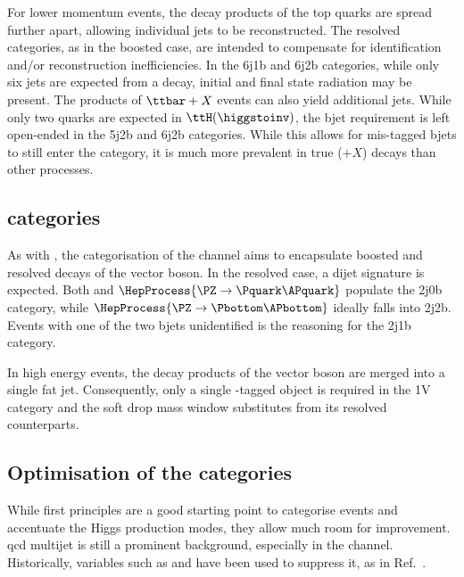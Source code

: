For lower momentum events, the decay products of the top quarks are spread further apart, allowing individual \glspl{jet} to be reconstructed. The \ttH resolved categories, as in the boosted case, are intended to compensate for identification and/or reconstruction inefficiencies. In the 6j1b and 6j2b categories, while only six \glspl{jet} are expected from a \ttbar decay, initial and final state radiation may be present. The products of $\ttbar + X$ events can also yield additional \glspl{jet}. While only two \Pbottom quarks are expected in $\ttH(\higgstoinv)$, the \gls{bjet} requirement is left open-ended in the 5j2b and 6j2b categories. While this allows for mis-tagged \glspl{bjet} to still enter the category, it is much more prevalent in true \ttbar ($+ X$) decays than other processes.




\subsection{\texorpdfstring{\VH}{VH} categories}
\label{subsec:htoinv_VH_subcats}

As with \ttH, the categorisation of the \VH channel aims to encapsulate boosted and resolved decays of the vector boson. In the resolved case, a dijet signature is expected. Both \PW and $\HepProcess{\PZ \to \Pquark\APquark}$ populate the 2j0b category, while $\HepProcess{\PZ \to \Pbottom\APbottom}$ ideally falls into 2j2b. Events with one of the two \glspl{bjet} unidentified is the reasoning for the 2j1b category.

In high energy events, the decay products of the vector boson are merged into a single fat jet. Consequently, only a single \PVec-tagged object is required in the 1V category and the soft drop mass window substitutes \mjj from its resolved counterparts.




\subsection{Optimisation of the categories}
\label{subsec:htoinv_cat_optimisation}

While first principles are a good starting point to categorise events and accentuate the Higgs production modes, they allow much room for improvement. \acrshort{qcd} multijet is still a prominent background, especially in the \ttH channel. Historically, variables such as \biasedDPhi and \alphat have been used to suppress it, as in Ref.~.


